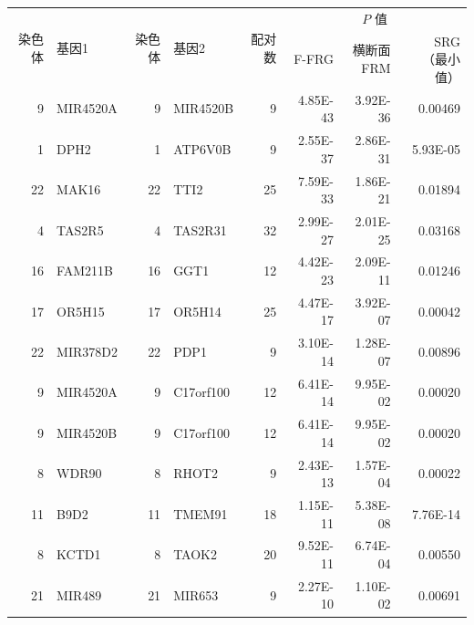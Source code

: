\begin{table}[htbp]
\centering
{}
\label{tab:ch03-08}
\small
\setlength{\tabcolsep}{4pt}
\begin{tabular}{rlrlrrrr}
\toprule
\multirow{2}{*}{染色体} & \multirow{2}{*}{基因1} & \multirow{2}{*}{染色体} & \multirow{2}{*}{基因2} & \multirow{2}{*}{配对数} & \multicolumn{3}{c}{$P$ 值}\\
\cmidrule(lr){6-8}
&&&&&F-FRG&\shortstack{横断面\\FRM}&\shortstack{SRG\\（最小值）}\\
\midrule
9 & MIR4520A & 9 & MIR4520B & 9 & 4.85E-43 & 3.92E-36 & 0.00469\\
1 & DPH2 & 1 & ATP6V0B & 9 & 2.55E-37 & 2.86E-31 & 5.93E-05\\
22 & MAK16 & 22 & TTI2 & 25 & 7.59E-33 & 1.86E-21 & 0.01894\\
4 & TAS2R5 & 4 & TAS2R31 & 32 & 2.99E-27 & 2.01E-25 & 0.03168\\
16 & FAM211B & 16 & GGT1 & 12 & 4.42E-23 & 2.09E-11 & 0.01246\\
17 & OR5H15 & 17 & OR5H14 & 25 & 4.47E-17 & 3.92E-07 & 0.00042\\
22 & MIR378D2 & 22 & PDP1 & 9 & 3.10E-14 & 1.28E-07 & 0.00896\\
9 & MIR4520A & 9 & C17orf100 & 12 & 6.41E-14 & 9.95E-02 & 0.00020\\
9 & MIR4520B & 9 & C17orf100 & 12 & 6.41E-14 & 9.95E-02 & 0.00020\\
8 & WDR90 & 8 & RHOT2 & 9 & 2.43E-13 & 1.57E-04 & 0.00022\\
11 & B9D2 & 11 & TMEM91 & 18 & 1.15E-11 & 5.38E-08 & 7.76E-14\\
8 & KCTD1 & 8 & TAOK2 & 20 & 9.52E-11 & 6.74E-04 & 0.00550\\
21 & MIR489 & 21 & MIR653 & 9 & 2.27E-10 & 1.10E-02 & 0.00691\\
\bottomrule
\end{tabular}
\end{table}
